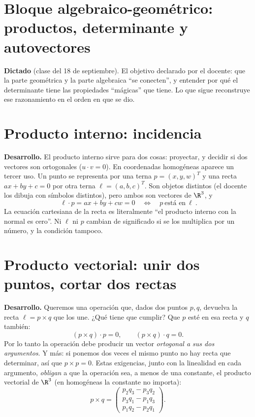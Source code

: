 \section{Bloque algebraico-geométrico: productos, determinante y autovectores}\label{cap:11}\label{sec:bloque-algebraico}

\textbf{Dictado} (clase del 18 de septiembre). El objetivo declarado por el docente: que la
parte geométrica y la parte algebraica ``se conecten'', y entender por qué el determinante
tiene las propiedades ``mágicas'' que tiene. Lo que sigue reconstruye ese razonamiento en el
orden en que se dio.

\section{Producto interno: incidencia}\label{sec:interno}

{\small\vspace{1mm}\par}


\textbf{Desarrollo.} El producto interno sirve para dos cosas: proyectar, y decidir si dos
vectores son ortogonales (\(u\cdot v=0\)). En coordenadas homogéneas aparece un tercer uso.
Un punto se representa por una terna \(p=(x,y,w)^T\) y una recta \(ax+by+c=0\) por otra
terna \(\ell=(a,b,c)^T\). Son objetos distintos (el docente los dibuja con símbolos
distintos), pero ambos son vectores de \(\R^3\), y
\[
  \boxed{\ \ell\cdot p=ax+by+cw=0\quad\Longleftrightarrow\quad p\ \text{está en}\ \ell\ }.
\]
La ecuación cartesiana de la recta es literalmente ``el producto interno con la normal es
cero''. Ni \(\ell\) ni \(p\) cambian de significado si se los multiplica por un número, y la
condición tampoco.

\section{Producto vectorial: unir dos puntos, cortar dos rectas}\label{sec:vectorial}

\textbf{Desarrollo.} Queremos una operación que, dados dos puntos \(p,q\), devuelva la recta
\(\ell=p\times q\) que los une. ¿Qué tiene que cumplir? Que \(p\) esté en esa recta y \(q\)
también:
\[
  (p\times q)\cdot p=0,\qquad (p\times q)\cdot q=0 .
\]
Por lo tanto la operación debe producir un vector \emph{ortogonal a sus dos argumentos}. Y
más: si ponemos dos veces el mismo punto no hay recta que determinar, así que \(p\times p=0\).
Estas exigencias, junto con la linealidad en cada argumento, \emph{obligan} a que la
operación sea, a menos de una constante, el producto vectorial de \(\R^3\) (en homogéneas
la constante no importa):
\[
  p\times q=\begin{pmatrix}p_2q_3-p_3q_2\\ p_3q_1-p_1q_3\\ p_1q_2-p_2q_1\end{pmatrix}.
\]

